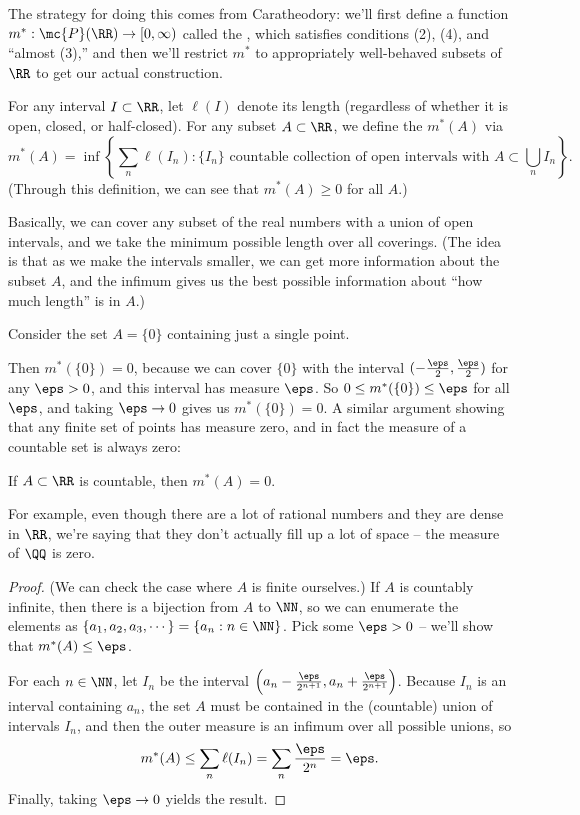 The strategy for doing this comes from Caratheodory: we'll first define a function $m^\ast: \mc{P}(\RR) \to [0, \infty)$ called the , which satisfies conditions (2), (4), and ``almost (3),'' and then we'll restrict $m^\ast$ to appropriately well-behaved subsets of $\RR$ to get our actual construction. 

\begin{definition}
For any interval $I \subset \RR$, let $\ell(I)$ denote its length (regardless of whether it is open, closed, or half-closed). For any subset $A \subset \RR$, we define the  $m^\ast(A)$ via
\[
    m^\ast(A) = \inf\left\{\sum_n \ell(I_n): \{I_n\} \text{ countable collection of open intervals with }A \subset \bigcup_n I_n\right\}.
\]
(Through this definition, we can see that $m^\ast(A) \ge 0$ for all $A$.)
\end{definition}

Basically, we can cover any subset of the real numbers with a union of open intervals, and we take the minimum possible length over all coverings. (The idea is that as we make the intervals smaller, we can get more information about the subset $A$, and the infimum gives us the best possible information about ``how much length'' is in $A$.)

\begin{example}
Consider the set $A = \{0\}$ containing just a single point. 
\end{example}

Then $m^\ast(\{0\}) = 0$, because we can cover $\{0\}$ with the interval $(-\frac{\eps}{2}, \frac{\eps}{2})$ for any $\eps > 0$, and this interval has measure $\eps$. So $0 \le m^\ast(\{0\}) \le \eps$ for all $\eps$, and taking $\eps \to 0$ gives us $m^\ast(\{0\}) = 0$. A similar argument showing that any finite set of points has measure zero, and in fact the measure of a countable set is always zero:

\begin{theorem}\label{meascountab}
If $A \subset \RR$ is countable, then $m^\ast(A) = 0$.
\end{theorem}

For example, even though there are a lot of rational numbers and they are dense in $\RR$, we're saying that they don't actually fill up a lot of space -- the measure of $\QQ$ is zero. 

\begin{proof}
(We can check the case where $A$ is finite ourselves.) If $A$ is countably infinite, then there is a bijection from $A$ to $\NN$, so we can enumerate the elements as $\{a_1, a_2, a_3, \cdots\} = \{a_n: n \in \NN\}$. Pick some $\eps > 0$ -- we'll show that $m^\ast(A) \le \eps$. 

For each $n \in \NN$, let $I_n$ be the interval $\left(a_n - \frac{\eps}{2^{n+1}}, a_n + \frac{\eps}{2^{n+1}}\right)$. Because $I_n$ is an interval containing $a_n$, the set $A$ must be contained in the (countable) union of intervals $I_n$, and then the outer measure is an infimum over all possible unions, so 
\[
    m^\ast(A) \le \sum_n \ell(I_n) = \sum_n \frac{\eps}{2^n} = \eps.
\]
Finally, taking $\eps \to 0$ yields the result.
\end{proof}

